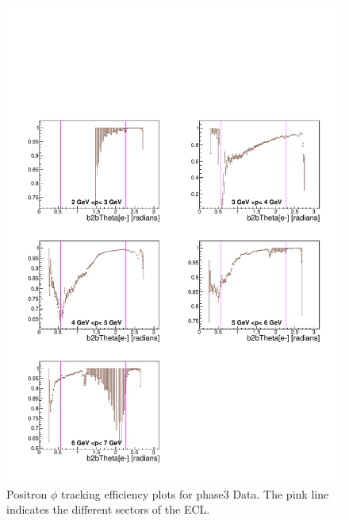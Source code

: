 \documentclass[a4paper,11pt,twosided,final,german,openbib,pdftex,listof=totoc,bibliography=totoc]{scrbook}
\begin{document}
\begin{appendix}
\begin{figure}[!htbp]
	\centering
	\includegraphics[width=\textwidth]{Plots/master3/xPMThetaep_DataP3}
	\caption[Momentum $\theta$ Positron Efficiency Phase3 Data]{Positron $\phi$ tracking efficiency plots for phase3 Data. The pink line indicates the different sectors of the ECL.}
	\label{plt:PMThetaep3_Data}
\end{figure}


\clearpage











\end{appendix}
\end{document}
